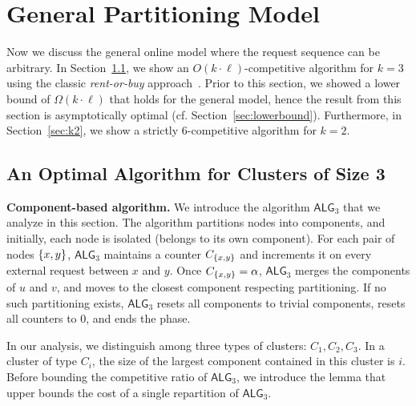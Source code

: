 \documentclass[a4paper,anonymous,USenglish]{lipics-v2019}
\newcommand{\OPT}{\textsc{OPT}\xspace}
\newcommand{\OBRP}{BRP\xspace}
\newcommand{\TAlg}{{\ensuremath{\textsf{ALG}_{3}}}\xspace}
\DeclarePairedDelimiter\set{\{}{\}}
\begin{document}

\section{General Partitioning Model}
\label{sec:part}

Now  we discuss the general online
model where the request sequence
can be arbitrary.
In Section~\ref{sec:k3}, we show an $O(k \cdot \ell)$-competitive algorithm for $k=3$ using the classic \emph{rent-or-buy} approach~\cite{karlin-ski-rental}.
Prior to this section, we showed a lower bound of $\Omega(k \cdot \ell)$  that holds for the general model, hence the result from this section is asymptotically optimal (cf. Section~\ref{sec:lowerbound}).
Furthermore, in Section~\ref{sec:k2}, we show a strictly $6$-competitive algorithm for $k=2$.



\subsection{An Optimal Algorithm for Clusters of Size 3}
\label{sec:k3}




\noindent
\textbf{Component-based algorithm.}
We introduce the algorithm \TAlg that we analyze in this section.
The algorithm partitions nodes into components, and
initially, each node is isolated (belongs to its own component).
For each pair of nodes $\set{x,y}$, \TAlg maintains a counter $C_{\set{x,y}}$ and increments it on every external request between $x$ and $y$.
Once $C_{\set{x,y}} = \alpha$, \TAlg merges the components of $u$ and $v$, and moves to the closest component respecting partitioning.
If no such partitioning exists, \TAlg resets all components to trivial components, resets all counters to $0$, and ends the phase.



In our analysis, we distinguish among three types of clusters: $C_1, C_2, C_3$. In a cluster of type $C_i$, the size of the largest component contained in this cluster is $i$.
Before bounding the competitive ratio of \TAlg, we introduce the lemma that upper bounds the cost of a single repartition of \TAlg.
\end{document}
